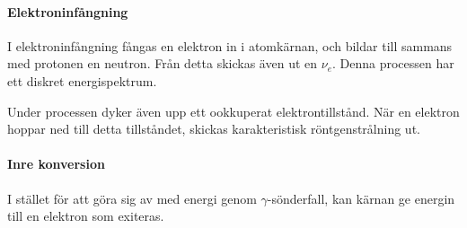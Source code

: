 \paragraph{Elektroninfångning}
I elektroninfångning fångas en elektron in i atomkärnan, och bildar till sammans med protonen en neutron. Från detta skickas även ut en $\nu_{e}$. Denna processen har ett diskret energispektrum.

Under processen dyker även upp ett ookkuperat elektrontillstånd. När en elektron hoppar ned till detta tillståndet, skickas karakteristisk röntgenstrålning ut.

\paragraph{Inre konversion}
I stället för att göra sig av med energi genom $\gamma$-sönderfall, kan kärnan ge energin till en elektron som exiteras.